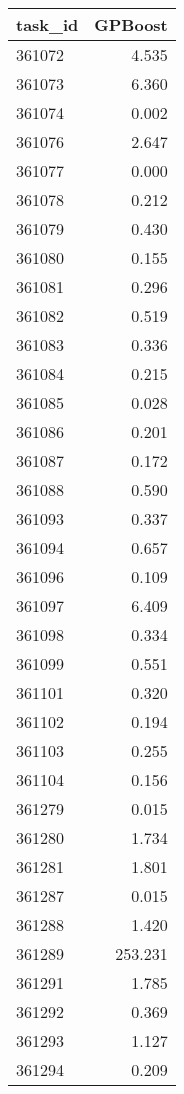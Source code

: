 \begin{tabular}{lr}
\toprule
task\_id & GPBoost \\
\midrule
361072 & 4.535 \\
361073 & 6.360 \\
361074 & 0.002 \\
361076 & 2.647 \\
361077 & 0.000 \\
361078 & 0.212 \\
361079 & 0.430 \\
361080 & 0.155 \\
361081 & 0.296 \\
361082 & 0.519 \\
361083 & 0.336 \\
361084 & 0.215 \\
361085 & 0.028 \\
361086 & 0.201 \\
361087 & 0.172 \\
361088 & 0.590 \\
361093 & 0.337 \\
361094 & 0.657 \\
361096 & 0.109 \\
361097 & 6.409 \\
361098 & 0.334 \\
361099 & 0.551 \\
361101 & 0.320 \\
361102 & 0.194 \\
361103 & 0.255 \\
361104 & 0.156 \\
361279 & 0.015 \\
361280 & 1.734 \\
361281 & 1.801 \\
361287 & 0.015 \\
361288 & 1.420 \\
361289 & 253.231 \\
361291 & 1.785 \\
361292 & 0.369 \\
361293 & 1.127 \\
361294 & 0.209 \\
\bottomrule
\end{tabular}
